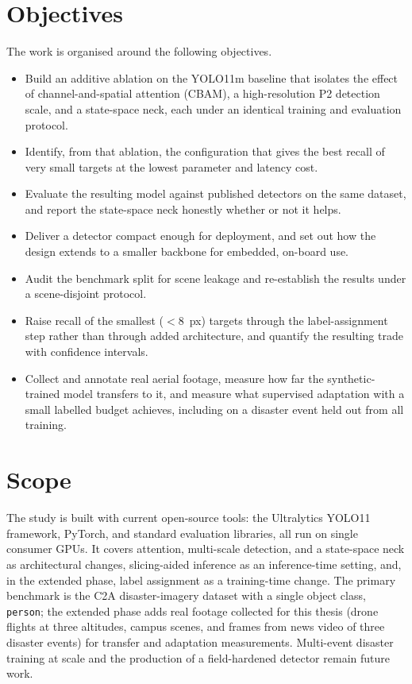 \section{Objectives}
The work is organised around the following objectives.
\begin{itemize}
  \item Build an additive ablation on the YOLO11m baseline that isolates the effect
        of channel-and-spatial attention (CBAM), a high-resolution P2 detection
        scale, and a state-space neck, each under an identical training and
        evaluation protocol.
  \item Identify, from that ablation, the configuration that gives the best recall
        of very small targets at the lowest parameter and latency cost.
  \item Evaluate the resulting model against published detectors on the same
        dataset, and report the state-space neck honestly whether or not it helps.
  \item Deliver a detector compact enough for deployment, and set out how the design
        extends to a smaller backbone for embedded, on-board use.
  \item Audit the benchmark split for scene leakage and re-establish the results
        under a scene-disjoint protocol.
  \item Raise recall of the smallest ($<8$~px) targets through the
        label-assignment step rather than through added architecture, and
        quantify the resulting trade with confidence intervals.
  \item Collect and annotate real aerial footage, measure how far the
        synthetic-trained model transfers to it, and measure what supervised
        adaptation with a small labelled budget achieves, including on a
        disaster event held out from all training.
\end{itemize}

\section{Scope}
The study is built with current open-source tools: the Ultralytics YOLO11
framework, PyTorch, and standard evaluation libraries, all run on single
consumer GPUs. It covers attention, multi-scale detection, and a state-space neck
as architectural changes, slicing-aided inference as an inference-time setting,
and, in the extended phase, label assignment as a training-time change. The
primary benchmark is the C2A disaster-imagery dataset with a single object
class, \texttt{person}; the extended phase adds real footage collected for this
thesis (drone flights at three altitudes, campus scenes, and frames from news
video of three disaster events) for transfer and adaptation measurements.
Multi-event disaster training at scale and the production of a field-hardened
detector remain future work.

